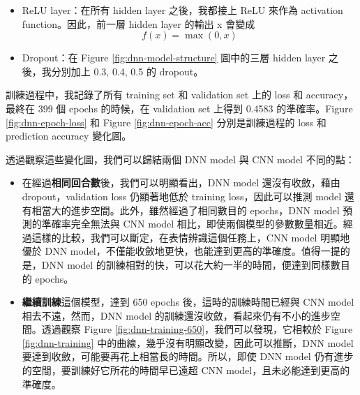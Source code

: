 \documentclass[12pt,a4paper]{extarticle}
\begin{document}
\begin{enumerate}
  \begin{itemize}
    \item ReLU layer：在所有 hidden layer 之後，我都接上 ReLU 來作為 activation function。因此，前一層 hidden layer 的輸出 x 會變成
    $$f(x) = \max(0, x)$$
    \item Dropout：在 Figure \ref{fig:dnn-model-structure} 圖中的三層 hidden layer 之後，我分別加上 0.3, 0.4, 0.5 的 dropout。
  \end{itemize}

  \par 訓練過程中，我記錄了所有 training set 和 validation set 上的 loss 和 accuracy，最終在 399 個 epochs 的時候，在 validation set 上得到 0.4583 的準確率。Figure \ref{fig:dnn-epoch-loss} 和 Figure \ref{fig:dnn-epoch-acc} 分別是訓練過程的 loss 和 prediction accuracy 變化圖。

  \par 透過觀察這些變化圖，我們可以歸結兩個 DNN model 與 CNN model 不同的點：
  \begin{itemize}
    \item 在經過\textbf{相同回合數}後，我們可以明顯看出，DNN model 還沒有收斂，藉由 dropout，validation loss 仍顯著地低於 training loss，因此可以推測 model 還有相當大的進步空間。此外，雖然經過了相同數目的 epochs，DNN model 預測的準確率完全無法與 CNN model 相比，即使兩個模型的參數數量相近。經過這樣的比較，我們可以斷定，在表情辨識這個任務上，CNN model 明顯地優於 DNN model，不僅能收斂地更快，也能達到更高的準確度。值得一提的是，DNN model 的訓練相對的快，可以花大約一半的時間，便達到同樣數目的 epochs。

    \item \textbf{繼續訓練}這個模型，達到 650 epochs 後，這時的訓練時間已經與 CNN model 相去不遠，然而，DNN model 的訓練還沒收斂，看起來仍有不小的進步空間。透過觀察 Figure \ref{fig:dnn-training-650}，我們可以發現，它相較於 Figure \ref{fig:dnn-training} 中的曲線，幾乎沒有明顯改變，因此可以推斷，DNN model 要達到收斂，可能要再花上相當長的時間。所以，即使 DNN model 仍有進步的空間，要訓練好它所花的時間早已遠超 CNN model，且未必能達到更高的準確度。
  \end{itemize}


\end{enumerate}
\end{document}
